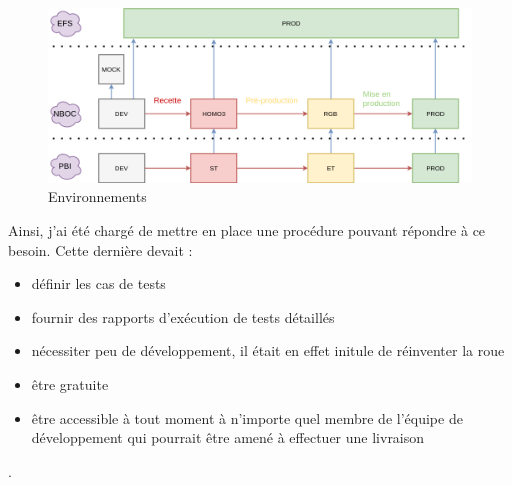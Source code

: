 \begin{figure}[h!]
	\includegraphics[scale=0.5]{images/travailNeuflizeOBC/architecture/environnement.png}
	\center
	\caption{Environnements}
	\label{environnement}
\end{figure}

	Ainsi, j'ai été chargé de mettre en place une procédure pouvant répondre à ce besoin. Cette dernière devait :	
	\begin{itemize}
		\item définir les cas de tests
		\item fournir des rapports d'exécution de tests détaillés
		\item nécessiter peu de développement, il était en effet initule de réinventer la roue
		\item être gratuite
		\item être accessible à tout moment à n'importe quel membre de l'équipe de développement qui pourrait être amené à effectuer une livraison \\
	\end{itemize}
	
	\color{white} . \color{black}